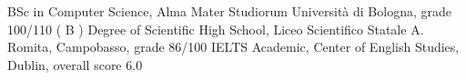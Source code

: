 %
%
%


\begin{scholarship}
					{BSc in Computer Science, Alma Mater Studiorum Universit\`a di Bologna, grade 100/110 ( B ) }
					{Degree of Scientific High School, Liceo Scientifico Statale A. Romita, Campobasso, grade 86/100}
					{IELTS Academic, Center of English Studies, Dublin, overall score 6.0}
\end{scholarship}
